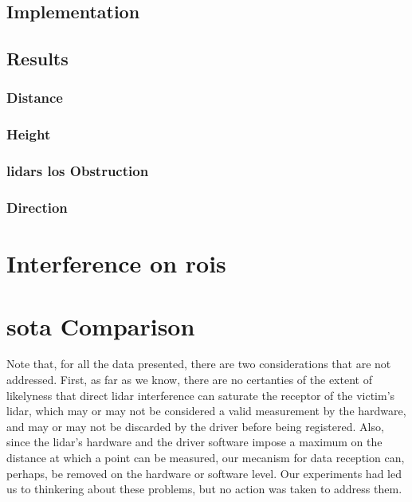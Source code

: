 \subsection{Implementation}

\subsection{Results}
\subsubsection{Distance}
\subsubsection{Height}
\subsubsection{\acp{lidar} \ac{los} Obstruction}
\subsubsection{Direction}

\section{Interference on \acp{roi}}

\section{\acl{sota} Comparison}
Note that, for all the data presented, there are two considerations that are not addressed. First, as far as we know, there are no certanties of the extent of likelyness that direct \ac{lidar} interference can saturate the receptor of the victim's \ac{lidar}, which may or may not be considered a valid measurement by the hardware, and may or may not be discarded by the driver before being registered. Also, since the \ac{lidar}'s hardware and the driver software impose a maximum on the distance at which a point can be measured, our mecanism for data reception can, perhaps, be removed on the hardware or software level. Our experiments had led us to thinkering about these problems, but no action was taken to address them.
